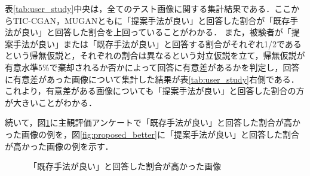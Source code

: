 表\ref{tab:user_study}中央は，全てのテスト画像に関する集計結果である．ここからTIC-CGAN，MUGANともに「提案手法が良い」と回答した割合が「既存手法が良い」と回答した割合を上回っていることがわかる．
また，被験者が「提案手法が良い」または「既存手法が良い」と回答する割合がそれぞれ1/2であるという帰無仮説と，それぞれの割合は異なるという対立仮説を立て，帰無仮説が有意水準5\%で棄却されるか否かによって回答に有意差があるかを判定し，回答に有意差があった画像について集計した結果が表\ref{tab:user_study}右側である．これより，有意差がある画像についても「提案手法が良い」と回答した割合の方が大きいことがわかる．\par

続いて，図\ref{fig:existing_better}に主観評価アンケートで「既存手法が良い」と回答した割合が高かった画像の例を，図\ref{fig:proposed_better}に「提案手法が良い」と回答した割合が高かった画像の例を示す．

\begin{figure}[tb]
    \centering
    \caption{「既存手法が良い」と回答した割合が高かった画像}
    \label{fig:existing_better}
\end{figure}

